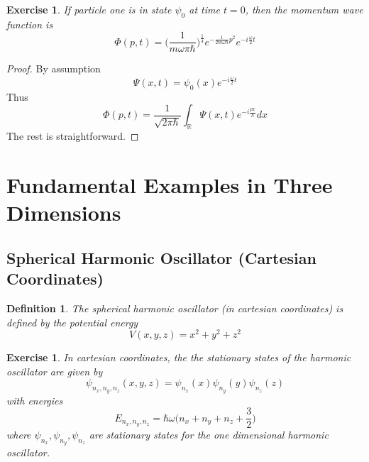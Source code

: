 \documentclass[12pt]{amsart}
\newtheorem{defn}[thm]{Definition}
\newtheorem{ex}[thm]{Exercise}
\newcommand{\om}{\omega}
\newcommand{\R}{\mathbb{R}}
\begin{document}
\begin{ex}
If particle one is in state $\psi_0$ at time $t=0$, then the momentum wave function is $$\Phi(p,t) = \bigg(\frac{1}{m \om \pi \hbar}\bigg)^{\frac{1}{4}}e^{-\frac{1}{2m \om \hbar}p^2}e^{-i \frac{\om}{2}t}$$
\end{ex}

\begin{proof}
By assumption $$\Psi(x,t) = \psi_0(x)e^{-i \frac{\om}{2}t}$$ Thus $$\Phi(p,t) = \frac{1}{\sqrt{2 \pi \hbar}}\int_{\R}\Psi(x,t)e^{-i\frac{px}{h}}dx$$
The rest is straightforward.
\end{proof}

\section{Fundamental Examples in Three Dimensions}

\subsection{Spherical Harmonic Oscillator (Cartesian Coordinates)}

\begin{defn}
The spherical harmonic oscillator (in cartesian coordinates) is defined by the potential energy
$$V(x,y,z) = x^2 + y^2 + z^2$$
\end{defn}

\begin{ex}
In cartesian coordinates, the the stationary states of the harmonic oscillator are given by $$\psi_{n_x, n_y, n_z}(x,y,z) = \psi_{n_x}(x)\psi_{n_y}(y)\psi_{n_z}(z)$$ with energies $$E_{n_x,n_y, n_z} = \hbar \om \bigg (n_x + n_y + n_z + \frac{3}{2} \bigg)$$ where $\psi_{n_x}, \psi_{n_y}, \psi_{n_z}$ are stationary states for the one dimensional harmonic oscillator.
\end{ex}
\end{document}
